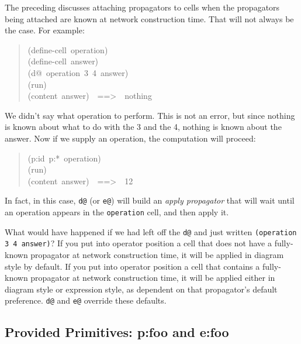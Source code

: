 \documentclass[12pt,letterpaper,english]{article}
\begin{document}
The preceding discusses attaching propagators to cells when the
propagators being attached are known at network construction time.
That will not always be the case.  For example:
\begin{quote}{\ttfamily \raggedright \noindent
(define-cell~operation)~\\
(define-cell~answer)~\\
(d@~operation~3~4~answer)~\\
(run)~\\
(content~answer)~~==>~~nothing
}\end{quote}

We didn't say what operation to perform.  This is not an error, but
since nothing is known about what to do with the 3 and the 4, nothing
is known about the answer.  Now if we supply an operation, the
computation will proceed:
\begin{quote}{\ttfamily \raggedright \noindent
(p:id~p:*~operation)~\\
(run)~\\
(content~answer)~~==>~~12
}\end{quote}

In fact, in this case, \texttt{d@} (or \texttt{e@}) will build an \emph{apply propagator}
that will wait until an operation appears in the
\texttt{operation} cell, and then apply it.

What would have happened if we had left off the \texttt{d@} and just
written \texttt{(operation 3 4 answer)}?  If you put into operator position
a cell that does not have a fully-known propagator at network
construction time, it will be applied in diagram style by default.  If
you put into operator position a cell that contains a fully-known
propagator at network construction time, it will be applied either in
diagram style or expression style, as dependent on that propagator's
default preference.  \texttt{d@} and \texttt{e@} override these defaults.



\hypertarget{provided-primitives-p-foo-and-e-foo}{}
\subsection{Provided Primitives: p:foo and e:foo}
\label{provided-primitives-p-foo-and-e-foo}
\end{document}
